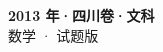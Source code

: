 \documentclass[zihao=-4, a4paper]{ctexart}
\begin{document}
\begin{center}
  {\Large\bfseries 2013 年·四川卷·文科}\\[4pt]
  {\large 数学 · 试题版}
\end{center}
\medskip
{}

\end{document}
